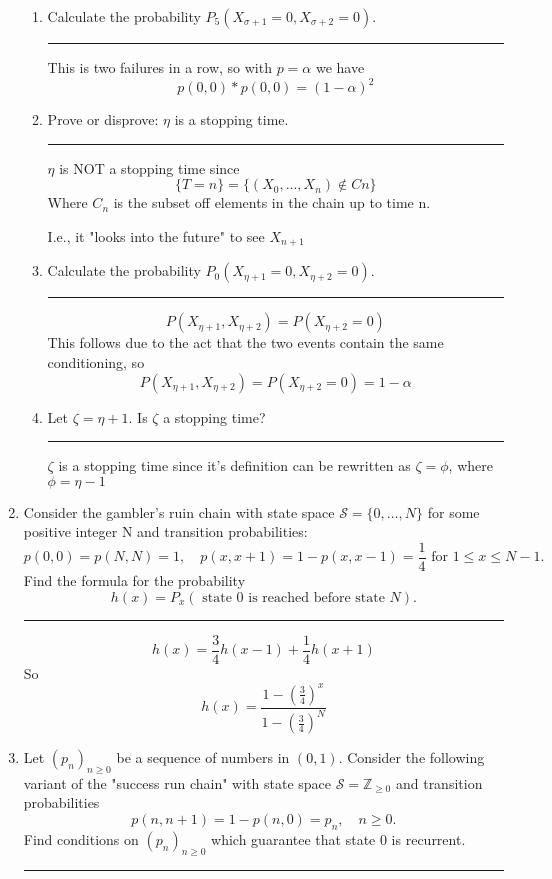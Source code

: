 \documentclass{article} %
\theoremstyle{plain}
\theoremstyle{case}
\begin{document}
\begin{enumerate}[label={\fbox{\textbf{Exercise \#\arabic* :}}}]
\begin{enumerate}
	\item  Calculate the probability $P_5\left(X_{\sigma+1}=0, X_{\sigma+2}=0\right)$.
\par\noindent\rule{\textwidth}{0.1pt}
      This is two failures in a row, so with $p = \alpha$ we have
      \[ p(0,0) * p(0,0) = (1 - \alpha)^2 \]
	\item  Prove or disprove: $\eta$ is a stopping time.
\par\noindent\rule{\textwidth}{0.1pt}
      $\eta$ is NOT a stopping time since 
     \[ \{T = n\} = \{(X_0,...,X_n) \notin Cn \} \]
      Where $C_n$ is the subset off elements in the chain up to time n.

      I.e., it "looks into the future" to see $X_{n+1}$
	\item  Calculate the probability $P_0\left(X_{\eta+1}=0, X_{\eta+2}=0\right)$.
\par\noindent\rule{\textwidth}{0.1pt}
      \[ P(X_{\eta + 1},X_{\eta + 2}) = P(X_{\eta + 2}=0)  \]
      This follows due to the act that the two events contain the same
      conditioning, so
      \[ P(X_{\eta + 1},X_{\eta + 2}) = P(X_{\eta + 2}=0) = 1 - \alpha \]
	\item  Let $\zeta=\eta+1$. Is $\zeta$ a stopping time?
\par\noindent\rule{\textwidth}{0.1pt}
      $\zeta$ is a stopping time since it's definition can be rewritten
      as $\zeta = \phi$, where $\phi = \eta - 1$
  \end{enumerate}

\newpage

  \item Consider the gambler's ruin chain with state space $\mathcal{S}=\{0, \ldots, N\}$ for some positive integer $\mathrm{N}$ and transition probabilities:
$$
p(0,0)=p(N, N)=1, \quad p(x, x+1)=1-p(x, x-1)=\frac{1}{4} \text { for } 1 \leq x \leq N-1 .
$$
Find the formula for the probability
$$
h(x)=P_x(\text { state } 0 \text { is reached before state } N) .
$$
\par\noindent\rule{\textwidth}{0.1pt}

  \[ h(x) = \frac{3}{4} h(x-1) + \frac{1}{4} h(x+1) \]
  So
  \[ h(x) = \frac{1- \left( \frac{3}{4} \right)^x }{ 1- \left( \frac{3}{4} \right)^N  }  \]

\newpage

  \item Let $\left(p_n\right)_{n \geq 0}$ be a sequence of numbers in $(0,1)$. Consider the following variant of the "success run chain" with state space $\mathcal{S}=\mathbb{Z}_{\geq 0}$ and transition probabilities
$$
p(n, n+1)=1-p(n, 0)=p_n, \quad n \geq 0 .
$$
Find conditions on $\left(p_n\right)_{n \geq 0}$ which guarantee that state 0 is recurrent.
\par\noindent\rule{\textwidth}{0.1pt}


\end{enumerate}
\end{document}

